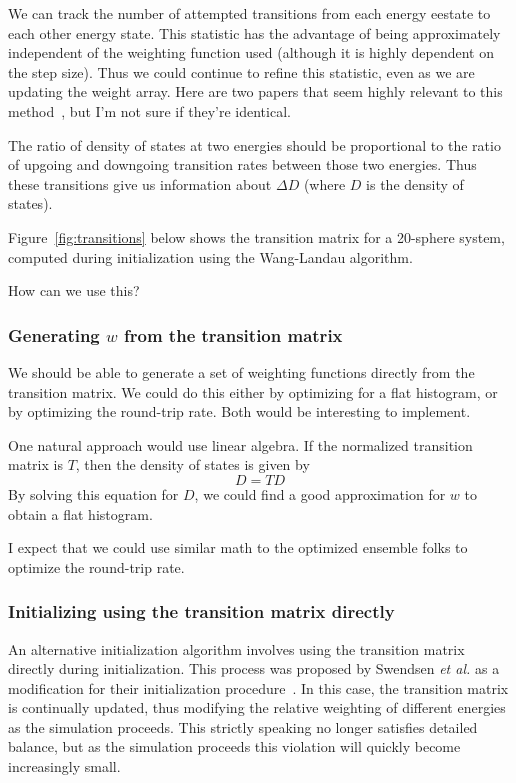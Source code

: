 \documentclass[letterpaper,twocolumn,amsmath,amssymb,pre,aps,10pt]{revtex4-1}
\begin{document}
We can track the number of attempted transitions from each energy
eestate to each other energy state.  This statistic has the advantage of
being approximately independent of the weighting function used
(although it is highly dependent on the step size).  Thus we could
continue to refine this statistic, even as we are updating the weight
array.  Here are two papers that seem highly relevant to this
method~\cite{wang1999transition, wang2002transition}, but I'm not sure
if they're identical.

The ratio of density of states at two energies should be proportional
to the ratio of upgoing and downgoing transition rates between those
two energies.  Thus these transitions give us information about
$\Delta D$ (where $D$ is the density of states).

Figure~\ref{fig:transitions} below shows the transition matrix for a
20-sphere system, computed during initialization using the Wang-Landau
algorithm.

How can we use this?

\subsubsection{Generating $w$ from the transition matrix}

We should be able to generate a set of weighting functions directly
from the transition matrix.  We could do this either by optimizing for
a flat histogram, or by optimizing the round-trip rate.  Both would be
interesting to implement.

One natural approach would use linear algebra.  If the normalized
transition matrix is $T$, then the density of states is given by
\begin{equation}
  D = TD
\end{equation}
By solving this equation for $D$, we could find a good approximation
for $w$ to obtain a flat histogram.

I expect that we could use similar math to the optimized ensemble
folks to optimize the round-trip rate.

\subsubsection{Initializing using the transition matrix directly}

An alternative initialization algorithm involves using the transition
matrix directly during initialization.  This process was proposed by
Swendsen \emph{et al.} as a modification for their initialization
procedure~\cite{swendsen1999transition}.  In this case, the transition
matrix is continually updated, thus modifying the relative weighting
of different energies as the simulation proceeds.  This strictly
speaking no longer satisfies detailed balance, but as the simulation
proceeds this violation will quickly become increasingly small.
\end{document}
